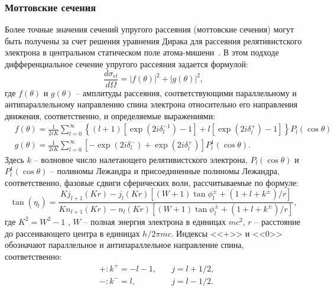 \subsubsection{Моттовские сечения}
Более точные значения сечений упругого рассеяния (моттовские сечения) могут быть получены за счет решения уравнения Дирака для рассеяния релятивистского электрона в центральном статическом поле атома-мишени~\cite{Czyzewski_mott_cs}. В этом подходе дифференциальное сечение упругого рассеяния задается формулой:
\begin{equation}
	\frac{d \sigma_{e l}}{d \Omega}=|f(\theta)|^2+|g(\theta)|^2,
\end{equation}
где $f(\theta)$ и $g(\theta)$ -- амплитуды рассеяния, соответствующими параллельному и антипараллельному направлению спина электрона относительно его направления движения, соответственно, и определяемые выражениями:
\begin{equation}
	\begin{aligned}
		&f(\theta)=\frac{1}{2 i K} \sum_{l=0}^{\infty}\left\{(l+1)\left[\exp \left(2 i \delta_l^{-1}\right)-1\right]+l\left[\exp \left(2 i \delta_l^{+}\right)-1\right]\right\} P_l(\cos \theta) \\
		&g(\theta)=\frac{1}{2 i K} \sum_{l=0}^{\infty}\left[-\exp \left(2 i \delta_l^{-}\right)+\exp \left(2 i \delta_l^{+}\right)\right] P_l^1(\cos \theta).
	\end{aligned}
\end{equation}
Здесь $k$ -- волновое число налетающего релятивистского электрона, $P_l(\cos \theta)$ и $P_l^1 (\cos \theta)$ -- полиномы Лежандра и присоединенные полиномы Лежандра, соответственно, фазовые сдвиги сферических волн, рассчитываемые по формуле:
\begin{equation}
	\tan \left(\eta_l\right)=\frac{K j_{l+1}(K r)-j_l(K r)\left[(W+1) \tan \phi_l^{\pm}+\left(1+l+k^{\pm}\right) / r\right]}{K n_{l+1}(K r)-n_l(K r)\left[(W+1) \tan \phi_l^{\pm}+\left(1+l+k^{\pm}\right) / r\right]},
\end{equation}
где $K^2 = W^2 - 1$ , $W$ -- полная энергия электрона в единицах $mc^2$, $r$ -- расстояние до рассеивающего центра в единицах $h/2 \pi mc$. 
Индексы <<+>> и <<0>> обозначают параллельное и антипараллельное направление спина, соответственно:
\begin{equation}
	\begin{aligned}
		&+: k^{+}=-l-1, \quad & j=l+1 / 2, \\
		&-: k^{-}=l, \quad & j=l-1 / 2 .
	\end{aligned}
\end{equation}

